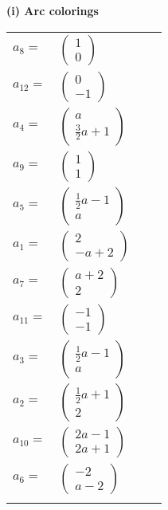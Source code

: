 \documentclass[1p]{elsarticle_modified}
\theoremstyle{definition}
\begin{document}
\flushleft \textbf{(i) Arc colorings}\\
\begin{tabular}{m{7pt} m{180pt} m{7pt} m{180pt} }
\flushright $a_{8}=$&$\begin{pmatrix}1\\0\end{pmatrix}$ \\
\flushright $a_{12}=$&$\begin{pmatrix}0\\-1\end{pmatrix}$ \\
\flushright $a_{4}=$&$\begin{pmatrix}a\\\frac{3}{2} a+1\end{pmatrix}$ \\
\flushright $a_{9}=$&$\begin{pmatrix}1\\1\end{pmatrix}$ \\
\flushright $a_{5}=$&$\begin{pmatrix}\frac{1}{2} a-1\\a\end{pmatrix}$ \\
\flushright $a_{1}=$&$\begin{pmatrix}2\\- a+2\end{pmatrix}$ \\
\flushright $a_{7}=$&$\begin{pmatrix}a+2\\2\end{pmatrix}$ \\
\flushright $a_{11}=$&$\begin{pmatrix}-1\\-1\end{pmatrix}$ \\
\flushright $a_{3}=$&$\begin{pmatrix}\frac{1}{2} a-1\\a\end{pmatrix}$ \\
\flushright $a_{2}=$&$\begin{pmatrix}\frac{1}{2} a+1\\2\end{pmatrix}$ \\
\flushright $a_{10}=$&$\begin{pmatrix}2 a-1\\2 a+1\end{pmatrix}$ \\
\flushright $a_{6}=$&$\begin{pmatrix}-2\\a-2\end{pmatrix}$\\&\end{tabular}
\end{document}
